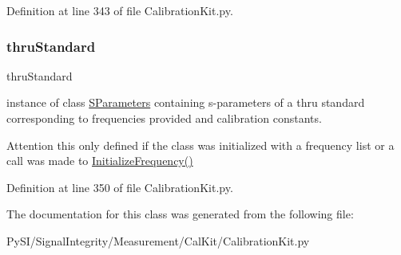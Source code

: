 Definition at line 343 of file Calibration\+Kit.\+py.

\mbox{\label{classSignalIntegrity_1_1Measurement_1_1CalKit_1_1CalibrationKit_1_1CalibrationKit_a63691e31dc0a91dbcfe40635f9c87599}} 
\subsubsection{\texorpdfstring{thru\+Standard}{thruStandard}}
{\footnotesize\ttfamily thru\+Standard}



instance of class \hyperlink{namespaceSignalIntegrity_1_1SParameters}{S\+Parameters} containing s-\/parameters of a thru standard corresponding to frequencies provided and calibration constants. 

\begin{DoxyAttention}{Attention}
this only defined if the class was initialized with a frequency list or a call was made to \hyperlink{classSignalIntegrity_1_1Measurement_1_1CalKit_1_1CalibrationKit_1_1CalibrationKit_a068ffbf43377a9e28cccb8b6013772ea}{Initialize\+Frequency()} 
\end{DoxyAttention}


Definition at line 350 of file Calibration\+Kit.\+py.



The documentation for this class was generated from the following file\+:\begin{DoxyCompactItemize}
\item 
Py\+S\+I/\+Signal\+Integrity/\+Measurement/\+Cal\+Kit/Calibration\+Kit.\+py\end{DoxyCompactItemize}
